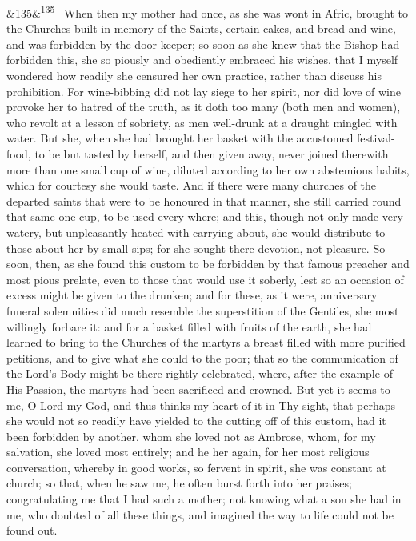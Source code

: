 \documentclass[12pt]{article}
\newcommand{\para}[1][]{\par\noindent\ifx&#1&\else\textsuperscript{\footnotesize #1}~\fi}
\begin{document}
\para[135] When then my mother had once, as she was wont in Afric, brought to the Churches built in memory of the Saints, certain cakes, and bread and wine, and was forbidden by the door-keeper; so soon as she knew that the Bishop had forbidden this, she so piously and obediently embraced his wishes, that I myself wondered how readily she censured her own practice, rather than discuss his prohibition. For wine-bibbing did not lay siege to her spirit, nor did love of wine provoke her to hatred of the truth, as it doth too many (both men and women), who revolt at a lesson of sobriety, as men well-drunk at a draught mingled with water. But she, when she had brought her basket with the accustomed festival-food, to be but tasted by herself, and then given away, never joined therewith more than one small cup of wine, diluted according to her own abstemious habits, which for courtesy she would taste. And if there were many churches of the departed saints that were to be honoured in that manner, she still carried round that same one cup, to be used every where; and this, though not only made very watery, but unpleasantly heated with carrying about, she would distribute to those about her by small sips; for she sought there devotion, not pleasure. So soon, then, as she found this custom to be forbidden by that famous preacher and most pious prelate, even to those that would use it soberly, lest so an occasion of excess might be given to the drunken; and for these, as it were, anniversary funeral solemnities did much resemble the superstition of the Gentiles, she most willingly forbare it: and for a basket filled with fruits of the earth, she had learned to bring to the Churches of the martyrs a breast filled with more purified petitions, and to give what she could to the poor; that so the communication of the Lord's Body might be there rightly celebrated, where, after the example of His Passion, the martyrs had been sacrificed and crowned. But yet it seems to me, O Lord my God, and thus thinks my heart of it in Thy sight, that perhaps she would not so readily have yielded to the cutting off of this custom, had it been forbidden by another, whom she loved not as Ambrose, whom, for my salvation, she loved most entirely; and he her again, for her most religious conversation, whereby in good works, so fervent in spirit, she was constant at church; so that, when he saw me, he often burst forth into her praises; congratulating me that I had such a mother; not knowing what a son she had in me, who doubted of all these things, and imagined the way to life could not be found out.
\end{document}
